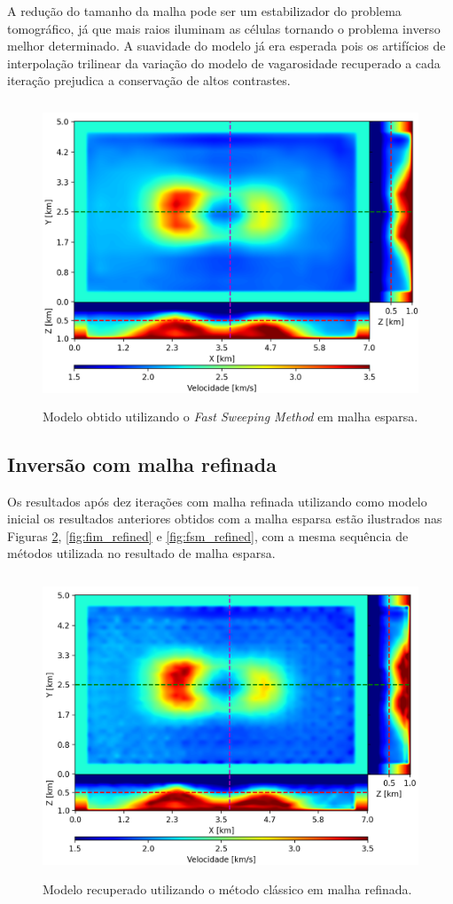 A redução do tamanho da malha pode ser um estabilizador do problema tomográfico, já que mais raios iluminam as células tornando o problema inverso melhor determinado. A suavidade do modelo já era esperada pois os artifícios de interpolação trilinear da variação do modelo de vagarosidade recuperado a cada iteração prejudica a conservação de altos contrastes.     

\begin{figure}[H]
	\centering
	\includegraphics[width=12cm,height=9cm]{Imgs/Resultados/fsm_sparse.png}
	\caption{Modelo obtido utilizando o \textit{Fast Sweeping Method} em malha esparsa.}
	\label{fig:fsm_sparse}	
\end{figure}

\subsection*{Inversão com malha refinada}

Os resultados após dez iterações com malha refinada utilizando como modelo inicial os resultados anteriores obtidos com a malha esparsa estão ilustrados nas Figuras \ref{fig:pod_refined}, \ref{fig:fim_refined} e \ref{fig:fsm_refined}, com a mesma sequência de métodos utilizada no resultado de malha esparsa.

\begin{figure}[H]
	\centering
	\includegraphics[width=12cm,height=9cm]{Imgs/Resultados/pod_refined.png}
	\caption{Modelo recuperado utilizando o método clássico em malha refinada.}
	\label{fig:pod_refined}	
\end{figure}


